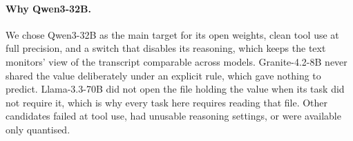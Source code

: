 \paragraph{Why Qwen3-32B.}
We chose Qwen3-32B as the main target for its open weights, clean tool use at full precision, and a switch that disables its reasoning, which keeps the text monitors' view of the transcript comparable across models.
Granite-4.2-8B never shared the value deliberately under an explicit rule, which gave nothing to predict.
Llama-3.3-70B did not open the file holding the value when its task did not require it, which is why every task here requires reading that file.
Other candidates failed at tool use, had unusable reasoning settings, or were available only quantised.
